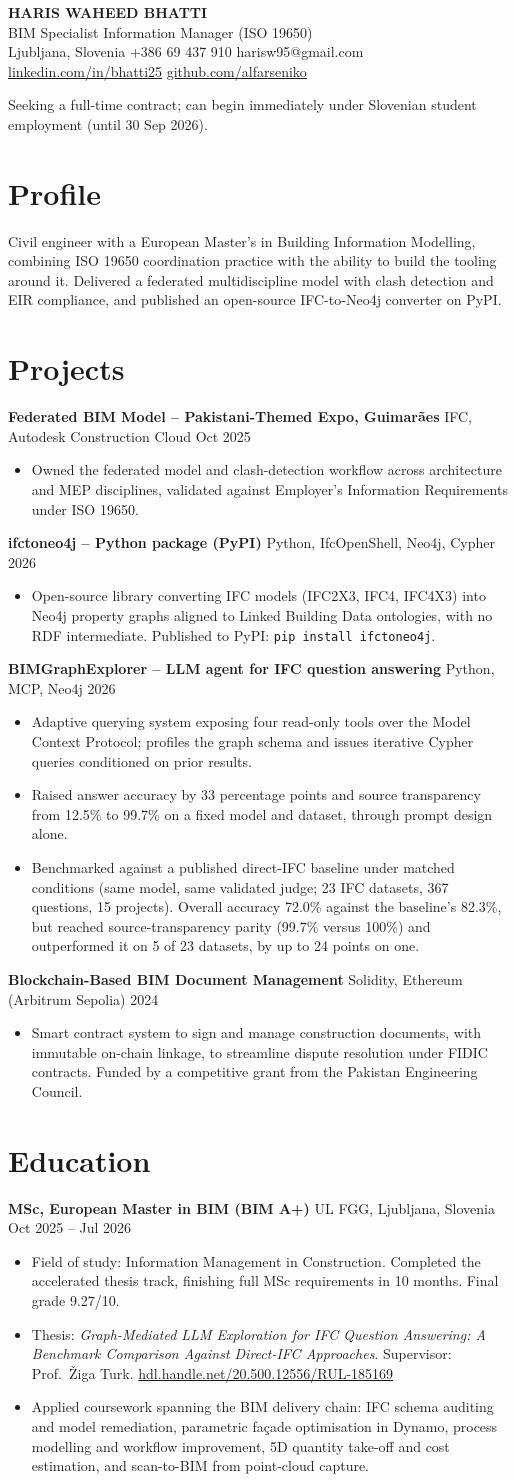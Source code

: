 \documentclass[a4paper,10.5pt]{article}
\newcommand{\datefill}{\dotfill}
\newcommand{\entry}[3]{\vspace{2.5pt}\noindent\textbf{#1} \textbar{} #2 \datefill{} #3\par\vspace{0.5pt}}
\newcommand{\ROLELINE}{BIM Specialist \textbar{} Information Manager (ISO 19650)}
\newcommand{\projIfcToNeo}{%
\entry{ifctoneo4j -- Python package (PyPI)}{Python, IfcOpenShell, Neo4j, Cypher}{2026}
\begin{itemize}
  \item Open-source library converting IFC models (IFC2X3, IFC4, IFC4X3) into Neo4j
        property graphs aligned to Linked Building Data ontologies, with no RDF
        intermediate. Published to PyPI: \texttt{pip install ifctoneo4j}.
\end{itemize}}
\newcommand{\projBIMGraph}{%
\entry{BIMGraphExplorer -- LLM agent for IFC question answering}{Python, MCP, Neo4j}{2026}
\begin{itemize}
  \item Adaptive querying system exposing four read-only tools over the Model
        Context Protocol; profiles the graph schema and issues iterative Cypher
        queries conditioned on prior results.
  \item Raised answer accuracy by 33 percentage points and source transparency from
        12.5\% to 99.7\% on a fixed model and dataset, through prompt design alone.
  \item Benchmarked against a published direct-IFC baseline under matched
        conditions (same model, same validated judge; 23 IFC datasets, 367
        questions, 15 projects). Overall accuracy 72.0\% against the baseline's
        82.3\%, but reached source-transparency parity (99.7\% versus 100\%) and
        outperformed it on 5 of 23 datasets, by up to 24 points on one.
\end{itemize}}
\newcommand{\projGuimaraes}{%
\entry{Federated BIM Model -- Pakistani-Themed Expo, Guimar\~aes}{IFC, Autodesk Construction Cloud}{Oct 2025}
\begin{itemize}
  \item Owned the federated model and clash-detection workflow across architecture
        and MEP disciplines, validated against Employer's Information Requirements
        under ISO 19650.
\end{itemize}}
\newcommand{\projBlockchain}{%
\entry{Blockchain-Based BIM Document Management}{Solidity, Ethereum (Arbitrum Sepolia)}{2024}
\begin{itemize}
  \item Smart contract system to sign and manage construction documents, with
        immutable on-chain linkage, to streamline dispute resolution under FIDIC
        contracts. Funded by a competitive grant from the
        Pakistan Engineering Council.
\end{itemize}}
\begin{document}
\begin{center}
  {\LARGE\bfseries HARIS WAHEED BHATTI}\\[2pt]
  {\large \ROLELINE}\\[3pt]
  Ljubljana, Slovenia \textbar{} +386 69 437 910 \textbar{} harisw95@gmail.com\\
  \href{https://linkedin.com/in/bhatti25}{linkedin.com/in/bhatti25} \textbar{}
  \href{https://github.com/alfarseniko}{github.com/alfarseniko}
\end{center}
\vspace{-4pt}
\noindent\small Seeking a full-time contract; can begin immediately under Slovenian student employment (until 30 Sep 2026).\normalsize

\section{Profile}

\noindent Civil engineer with a European Master's in Building Information Modelling,
combining ISO 19650 coordination practice with the ability to build the tooling
around it. Delivered a federated multidiscipline model with clash detection and EIR
compliance, and published an open-source IFC-to-Neo4j converter on PyPI.

\section{Projects}

 \projGuimaraes \projIfcToNeo \projBIMGraph \projBlockchain 

\section{Education}
\entry{MSc, European Master in BIM (BIM A+)}{UL FGG, Ljubljana, Slovenia}{Oct 2025 -- Jul 2026}
\begin{itemize}
  \item Field of study: Information Management in Construction. Completed the
        accelerated thesis track, finishing full MSc requirements in 10 months.
        Final grade 9.27/10.
  \item Thesis: \textit{Graph-Mediated LLM Exploration for IFC Question Answering:
        A Benchmark Comparison Against Direct-IFC Approaches}. Supervisor:
        Prof.~\v{Z}iga Turk. \href{http://hdl.handle.net/20.500.12556/RUL-185169}{hdl.handle.net/20.500.12556/RUL-185169}
  \item Applied coursework spanning the BIM delivery chain: IFC schema auditing and model remediation, parametric façade optimisation in Dynamo, process modelling and workflow improvement, 5D quantity take-off and cost estimation, and scan-to-BIM from point-cloud capture.
\end{itemize}
\end{document}
